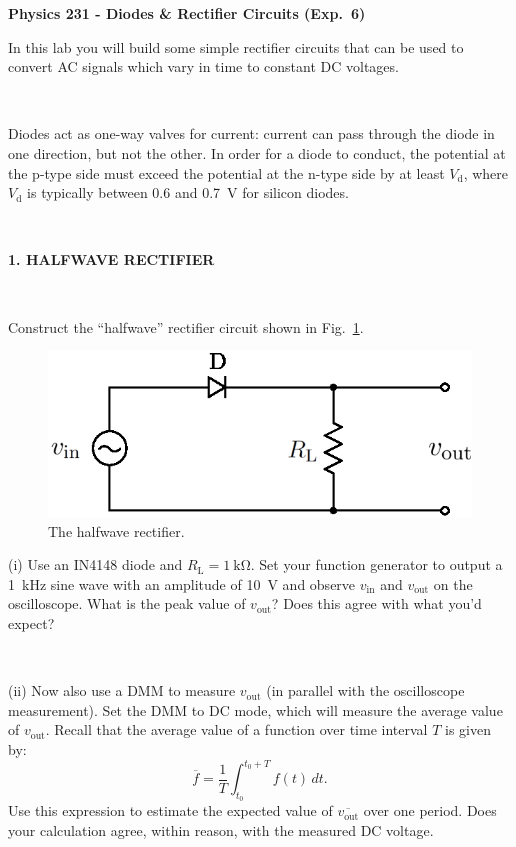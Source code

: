\documentclass[12pt,oneside,openany,letterpaper]{article}
\begin{document}
\thispagestyle{plain}
\begin{center}
{\large{\bf{\selectfont Physics 231 - Diodes \& Rectifier Circuits (Exp.~6)}}}
\end{center}

\noindent In this lab you will build some simple rectifier circuits that can be used to convert AC signals which vary in time to constant DC voltages.

~

\noindent Diodes act as one-way valves for current: current can pass through the diode in one direction, but not the other.  In order for a diode to conduct, the potential at the p-type side must exceed the potential at the n-type side by at least $V_\mathrm{d}$, where $V_\mathrm{d}$ is typically between \SI{0.6}{} and \SI{0.7}{\volt} for silicon diodes.


~

{\bf 1. HALFWAVE RECTIFIER}

~

\noindent Construct the ``halfwave'' rectifier circuit shown in Fig.~\ref{fig:halfwave}.
\begin{figure}[h!]
\begin{center}
\includegraphics[width=.45\textwidth]{halfWave.eps}
\caption{\label{fig:halfwave}The halfwave rectifier.}
\end{center}
\end{figure}

\noindent (i) Use an IN4148 diode and $R_\mathrm{L}=\SI{1}{\kilo\ohm}$. Set your function generator to output a \SI{1}{\kilo\hertz} sine wave with an amplitude of \SI{10}{\volt} and observe $v_\mathrm{in}$ and $v_\mathrm{out}$ on the oscilloscope.  What is the peak value of $v_\mathrm{out}$?  Does this agree with what you'd expect?

~

\noindent (ii) Now also use a DMM to measure $v_\mathrm{out}$ (in parallel with the oscilloscope measurement).  Set the DMM to DC mode, which will measure the average value of $v_\mathrm{out}$.  Recall that the average value of a function over time interval $T$ is given by:
$$
\overline{f}=\frac{1}{T}\int_{t_0}^{t_0+T}f(t)\,dt.
$$  
Use this expression to estimate the expected value of $\overline{v_\mathrm{out}}$ over one period.  Does your calculation agree, within reason, with the measured DC voltage.
\end{document}
